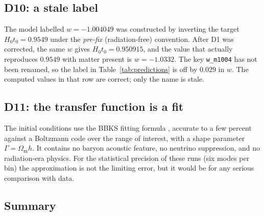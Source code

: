 \documentclass[11pt,a4paper]{article}
\theoremstyle{definition}
\newcommand{\Omm}{\Omega_{\mathrm{m}}}
\newcommand{\Hzt}{H_0 t_0}
\begin{document}
\subsection{D10: a stale label}

The model labelled $w = -1.004049$ was constructed by inverting the target
$\Hzt = 0.9549$ under the \emph{pre-fix} (radiation-free) convention. After
D1 was corrected, the same $w$ gives $\Hzt = 0.950915$, and the value that
actually reproduces $0.9549$ with matter present is $w = -1.0332$. The key
\texttt{w\_m1004} has not been renamed, so the label in
Table~\ref{tab:predictions} is off by $0.029$ in $w$. The computed values in
that row are correct; only the name is stale.

\subsection{D11: the transfer function is a fit}

The initial conditions use the BBKS fitting formula \cite{bbks1986}, accurate
to a few percent against a Boltzmann code over the range of interest, with a
shape parameter $\Gamma = \Omm h$. It contains no baryon acoustic feature, no
neutrino suppression, and no radiation-era physics. For the statistical
precision of these runs (six modes per bin) the approximation is not the
limiting error, but it would be for any serious comparison with data.

\subsection{Summary}
\end{document}
